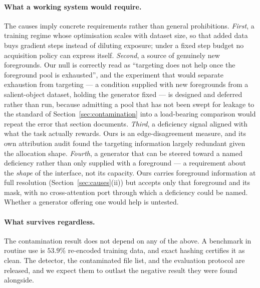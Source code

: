 \documentclass{article}
\begin{document}
\paragraph{What a working system would require.}
The causes imply concrete requirements rather than general prohibitions.
\emph{First}, a training regime whose optimisation scales with dataset size, so
that added data buys gradient steps instead of diluting exposure; under a fixed
step budget no acquisition policy can express itself. \emph{Second}, a source of
genuinely new foregrounds. Our null is correctly read as ``targeting does not
help once the foreground pool is exhausted'', and the experiment that would
separate exhaustion from targeting --- a condition supplied with new foregrounds
from a salient-object dataset, holding the generator fixed --- is designed and
deferred rather than run, because admitting a pool that has not been swept for
leakage to the standard of Section~\ref{sec:contamination} into a load-bearing
comparison would repeat the error that section documents.
\emph{Third}, a deficiency signal aligned with what the task actually rewards.
Ours is an edge-disagreement measure, and its own attribution audit found the
targeting information largely redundant given the allocation shape.
\emph{Fourth}, a generator that can be steered toward a named deficiency rather
than only supplied with a foreground --- a requirement about the \emph{shape} of
the interface, not its capacity. Ours carries foreground information at full
resolution (Section~\ref{sec:causes}(ii)) but accepts only that foreground and
its mask, with no cross-attention port through which a deficiency could be
named. Whether a generator offering one would help is untested.

\paragraph{What survives regardless.}
The contamination result does not depend on any of the above. A benchmark in
routine use is $53.9\%$ re-encoded training data, and exact hashing certifies it
as clean. The detector, the contaminated file list, and the evaluation protocol
are released, and we expect them to outlast the negative result they were found
alongside.
\end{document}
